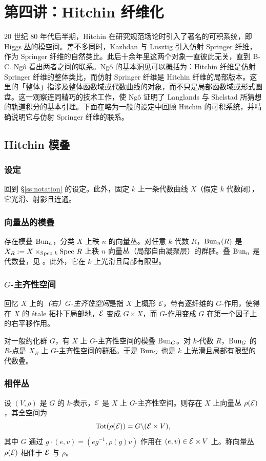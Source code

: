\section{第四讲：Hitchin 纤维化}

20 世纪 80 年代后半期，Hitchin 在研究规范场论时引入了著名的可积系统，即 Higgs 丛的模空间。差不多同时，Kazhdan 与 Lusztig 引入仿射 Springer 纤维，作为 Springer 纤维的自然类比。此后十余年里这两个对象一直彼此无关，直到 B-C. Ng\^o 看出两者之间的联系。Ng\^o 的基本洞见可以概括为：Hitchin 纤维是仿射 Springer 纤维的整体类比，而仿射 Springer 纤维是 Hitchin 纤维的局部版本。这里的「整体」指涉及整体函数域或代数曲线的对象，而不只是局部函数域或形式圆盘。这一观察连同精巧的技术工作，使 Ng\^o 证明了 Langlands 与 Shelstad 所猜想的轨道积分的基本引理。下面在略为一般的设定中回顾 Hitchin 的可积系统，并精确说明它与仿射 Springer 纤维的联系。

\subsection{Hitchin 模叠}

\subsubsection{设定} 回到 \S\ref{ss:notation} 的设定。此外，固定 $k$ 上一条代数曲线 $X$（假定 $k$ 代数闭），它光滑、射影且连通。

\subsubsection{向量丛的模叠}
存在模叠 $\textup{Bun}_{n}$，分类 $X$ 上秩 $n$ 的向量丛。对任意 $k$-代数 $R$，$\textup{Bun}_{n}(R)$ 是 $X_{R}:=X\times_{\textup{Spec}\  k}\textup{Spec}\  R$ 上秩 $n$ 向量丛（局部自由凝聚层）的群胚。叠 $\textup{Bun}_{n}$ 是代数叠，见 \cite[定理 4.6.2.1]{LMB}。此外，它在 $k$ 上光滑且局部有限型。

\subsubsection{$G$-主齐性空间}
回忆 $X$ 上的{\em（右）$G$-主齐性空间}是指 $X$ 上概形 $\mathcal{E}$，带有逐纤维的 $G$-作用，使得在 $X$ 的 étale 拓扑下局部地，$\mathcal{E}$ 变成 $G\times X$，而 $G$-作用变成 $G$ 在第一个因子上的右平移作用。

对一般约化群 $G$，有 $X$ 上 $G$-主齐性空间的模叠 $\textup{Bun}_{G}$。对 $k$-代数 $R$，$\textup{Bun}_{G}$ 的 $R$-点是 $X_{R}$ 上 $G$-主齐性空间的群胚。于是 $\textup{Bun}_{G}$ 也是 $k$ 上光滑且局部有限型的代数叠。

\subsubsection{相伴丛}\label{sss:ass bun} 设 $(V,\rho)$ 是 $G$ 的 $k$-表示，$\mathcal{E}$ 是 $X$ 上 $G$-主齐性空间。则存在 $X$ 上向量丛 $\rho(\mathcal{E})$，其全空间为
\begin{equation*}
\textup{Tot}(\rho(\mathcal{E}))=G\backslash (\mathcal{E}\times V),
\end{equation*}
其中 $G$ 通过 $g\cdot(e,v)=(eg^{-1}, \rho(g)v)$ 作用在 $(e,v)\in\mathcal{E}\times V$ 上。称向量丛 $\rho(\mathcal{E})$ 相伴于 $\mathcal{E}$ 与 $\rho$。

